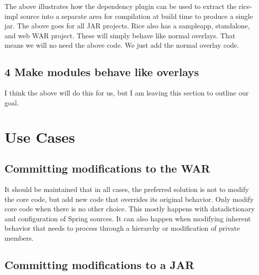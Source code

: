 \documentclass[12pt,notitlepage]{article}
\begin{document}
The above illustrates how the dependency plugin can be used to extract the rice-impl source into a separate area for compilation at build time to produce a single jar. The above goes for all JAR projects. Rice also has a sampleapp, standalone, and web WAR project. These will simply behave like normal overlays. That means we will no need the above code. We just add the normal overlay code.

\subsection*{4 Make modules behave like overlays}
I think the above will do this for us, but I am leaving this section to outline our goal.

\section{Use Cases}

\subsection{Committing modifications to the WAR}

It should be maintained that in all cases, the preferred solution is not to modify the core code, but add new code that overrides its original behavior. Only modify core code when there is no other choice. This mostly happens with datadictionary and configuration of Spring sources. It can also happen when modifying inherent behavior that needs to process through a hierarchy or modification of private members.

\subsection{Committing modifications to a JAR}

\newpage
\listoffigures
\lstlistoflistings
\end{document}
